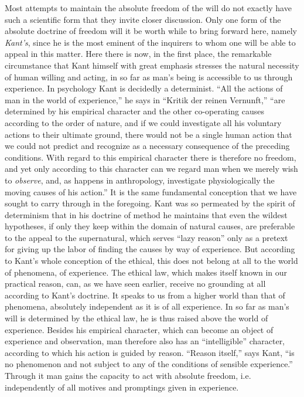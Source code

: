 \documentclass[12pt,a4paper,openany]{book}
\newcommand{\opage}[1]{\marginnote{\footnotesize\textit{[#1]}}}
\begin{document}
Most attempts to maintain the absolute freedom of the will do not exactly
have such a scientific form that they invite closer discussion. Only one
form of the absolute doctrine of freedom will it be worth while to bring
forward here, namely \emph{Kant's}, since he is the most eminent of the
inquirers to whom one will be able to appeal in this matter. Here there is
now, in the first place, the remarkable circumstance that Kant himself with
great emphasis stresses the natural necessity of human willing and acting,
in so far as man's being is accessible to us through experience. In
psychology Kant is decidedly a determinist. ``All the actions of man in the
world of experience,'' he says in ``Kritik der reinen Vernunft,'' ``are
determined by his empirical character and the other co-operating causes
according to the order of nature, and if we could investigate all his
voluntary actions to their ultimate ground, there would not be a single
human action that we could not predict and recognize as a necessary
consequence of the preceding conditions. With \opage{133}regard to this
empirical character there is therefore no freedom, and yet only according to
this character can we regard man when we merely wish to \emph{observe}, and,
as happens in anthropology, investigate physiologically the moving causes of
his action.'' It is the same fundamental conception that we have sought to
carry through in the foregoing. Kant was so permeated by the spirit of
determinism that in his doctrine of method he maintains that even the
wildest hypotheses, if only they keep within the domain of natural causes,
are preferable to the appeal to the supernatural, which serves ``lazy
reason'' only as a pretext for giving up the labor of finding the causes by
way of experience. But according to Kant's whole conception of the ethical,
this does not belong at all to the world of phenomena, of experience. The
ethical law, which makes itself known in our practical reason, can, as we
have seen earlier, receive no grounding at all according to Kant's doctrine.
It speaks to us from a higher world than that of phenomena, absolutely
independent as it is of all experience. In so far as man's will is
determined by the ethical law, he is thus raised above the world of
experience. Besides his empirical character, which can become an object of
experience and observation, man therefore also has an ``intelligible''
character, according to which his action is guided by reason. ``Reason
itself,'' says Kant, ``is no phenomenon and not subject to any of the
conditions of sensible experience.'' Through it man gains the capacity to
act with absolute \opage{134}freedom, i.e. independently of all motives and
promptings given in experience.
\end{document}
